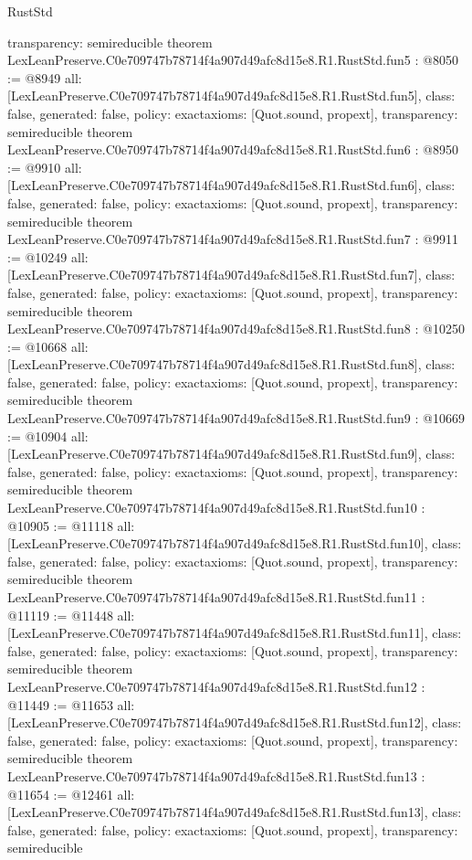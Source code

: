\begin{lexlean}{RustStd}
\begin{coremodule}
{  transparency: semireducible
}
theorem LexLeanPreserve.C0e709747b78714f4a907d49afc8d15e8.R1.RustStd.fun5 : @8050 := @8949 {
  all: [LexLeanPreserve.C0e709747b78714f4a907d49afc8d15e8.R1.RustStd.fun5],
  class: false,
  generated: false,
  policy: exact{axioms: [Quot.sound, propext]},
  transparency: semireducible
}
theorem LexLeanPreserve.C0e709747b78714f4a907d49afc8d15e8.R1.RustStd.fun6 : @8950 := @9910 {
  all: [LexLeanPreserve.C0e709747b78714f4a907d49afc8d15e8.R1.RustStd.fun6],
  class: false,
  generated: false,
  policy: exact{axioms: [Quot.sound, propext]},
  transparency: semireducible
}
theorem LexLeanPreserve.C0e709747b78714f4a907d49afc8d15e8.R1.RustStd.fun7 : @9911 := @10249 {
  all: [LexLeanPreserve.C0e709747b78714f4a907d49afc8d15e8.R1.RustStd.fun7],
  class: false,
  generated: false,
  policy: exact{axioms: [Quot.sound, propext]},
  transparency: semireducible
}
theorem LexLeanPreserve.C0e709747b78714f4a907d49afc8d15e8.R1.RustStd.fun8 : @10250 := @10668 {
  all: [LexLeanPreserve.C0e709747b78714f4a907d49afc8d15e8.R1.RustStd.fun8],
  class: false,
  generated: false,
  policy: exact{axioms: [Quot.sound, propext]},
  transparency: semireducible
}
theorem LexLeanPreserve.C0e709747b78714f4a907d49afc8d15e8.R1.RustStd.fun9 : @10669 := @10904 {
  all: [LexLeanPreserve.C0e709747b78714f4a907d49afc8d15e8.R1.RustStd.fun9],
  class: false,
  generated: false,
  policy: exact{axioms: [Quot.sound, propext]},
  transparency: semireducible
}
theorem LexLeanPreserve.C0e709747b78714f4a907d49afc8d15e8.R1.RustStd.fun10 : @10905 := @11118 {
  all: [LexLeanPreserve.C0e709747b78714f4a907d49afc8d15e8.R1.RustStd.fun10],
  class: false,
  generated: false,
  policy: exact{axioms: [Quot.sound, propext]},
  transparency: semireducible
}
theorem LexLeanPreserve.C0e709747b78714f4a907d49afc8d15e8.R1.RustStd.fun11 : @11119 := @11448 {
  all: [LexLeanPreserve.C0e709747b78714f4a907d49afc8d15e8.R1.RustStd.fun11],
  class: false,
  generated: false,
  policy: exact{axioms: [Quot.sound, propext]},
  transparency: semireducible
}
theorem LexLeanPreserve.C0e709747b78714f4a907d49afc8d15e8.R1.RustStd.fun12 : @11449 := @11653 {
  all: [LexLeanPreserve.C0e709747b78714f4a907d49afc8d15e8.R1.RustStd.fun12],
  class: false,
  generated: false,
  policy: exact{axioms: [Quot.sound, propext]},
  transparency: semireducible
}
theorem LexLeanPreserve.C0e709747b78714f4a907d49afc8d15e8.R1.RustStd.fun13 : @11654 := @12461 {
  all: [LexLeanPreserve.C0e709747b78714f4a907d49afc8d15e8.R1.RustStd.fun13],
  class: false,
  generated: false,
  policy: exact{axioms: [Quot.sound, propext]},
  transparency: semireducible
}
\end{coremodule}
\end{lexlean}
